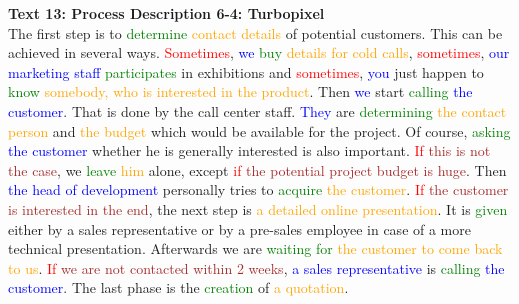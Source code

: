 \textbf{Text 13: Process Description 6-4: Turbopixel}\\
The first step is to \textcolor{green}{determine} \textcolor{orange}{contact} \textcolor{orange}{details} of potential customers. This can be achieved in several ways. \textcolor{red}{Sometimes}, \textcolor{blue}{we} \textcolor{green}{buy} \textcolor{orange}{details} \textcolor{orange}{for} \textcolor{orange}{cold} \textcolor{orange}{calls}, \textcolor{red}{sometimes}, \textcolor{blue}{our} \textcolor{blue}{marketing} \textcolor{blue}{staff} \textcolor{green}{participates} in exhibitions and \textcolor{red}{sometimes}, \textcolor{blue}{you} just happen to \textcolor{green}{know} \textcolor{orange}{somebody}\textcolor{orange}{,} \textcolor{orange}{who} \textcolor{orange}{is} \textcolor{orange}{interested} \textcolor{orange}{in} \textcolor{orange}{the} \textcolor{orange}{product}. Then \textcolor{blue}{we} start \textcolor{green}{calling} \textcolor{blue}{the} \textcolor{blue}{customer}. That is done by the call center staff. \textcolor{blue}{They} are \textcolor{green}{determining} \textcolor{orange}{the} \textcolor{orange}{contact} \textcolor{orange}{person} and \textcolor{orange}{the} \textcolor{orange}{budget} which would be available for the project. Of course, \textcolor{green}{asking} \textcolor{blue}{the} \textcolor{blue}{customer} whether he is generally interested is also important. \textcolor{red}{If} \textcolor{brown}{this} \textcolor{brown}{is} \textcolor{brown}{not} \textcolor{brown}{the} \textcolor{brown}{case}, we \textcolor{green}{leave} \textcolor{orange}{him} alone, except \textcolor{red}{if} \textcolor{brown}{the} \textcolor{brown}{potential} \textcolor{brown}{project} \textcolor{brown}{budget} \textcolor{brown}{is} \textcolor{brown}{huge}. Then \textcolor{blue}{the} \textcolor{blue}{head} \textcolor{blue}{of} \textcolor{blue}{development} personally tries to \textcolor{green}{acquire} \textcolor{orange}{the} \textcolor{orange}{customer}. \textcolor{red}{If} \textcolor{brown}{the} \textcolor{brown}{customer} \textcolor{brown}{is} \textcolor{brown}{interested} \textcolor{brown}{in} \textcolor{brown}{the} \textcolor{brown}{end}, the next step is \textcolor{orange}{a} \textcolor{orange}{detailed} \textcolor{orange}{online} \textcolor{orange}{presentation}. It is \textcolor{green}{given} either by a sales representative or by a pre-sales employee in case of a more technical presentation. Afterwards we are \textcolor{green}{waiting} \textcolor{green}{for} \textcolor{orange}{the} \textcolor{orange}{customer} \textcolor{orange}{to} \textcolor{orange}{come} \textcolor{orange}{back} \textcolor{orange}{to} \textcolor{orange}{us}. \textcolor{red}{If} \textcolor{brown}{we} \textcolor{brown}{are} \textcolor{brown}{not} \textcolor{brown}{contacted} \textcolor{brown}{within} \textcolor{brown}{2} \textcolor{brown}{weeks}, \textcolor{blue}{a} \textcolor{blue}{sales} \textcolor{blue}{representative} is \textcolor{green}{calling} \textcolor{blue}{the} \textcolor{blue}{customer}. The last phase is the \textcolor{green}{creation} of \textcolor{orange}{a} \textcolor{orange}{quotation}.


